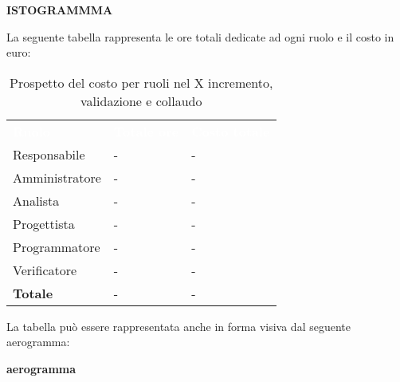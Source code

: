 \textbf{ISTOGRAMMMA}


La seguente tabella rappresenta le ore totali dedicate ad ogni ruolo e il costo in euro:

\begin{table}[!htbp]
\begin{center}
\renewcommand{\arraystretch}{1.5}
\begin{tabular}{ m{}<{\centering}  m{}<{\centering} m{}<{\centering}}
	\rowcolor{darkblue}
	\textcolor{white}{\textbf{Ruolo}}&\textcolor{white}{\textbf{Totale ore}}&\textcolor{white}{\textbf{Costo totale}}\\ 

	Responsabile  & - & - \\	

	\rowcolor{gray!10} Amministratore & - & - \\
	
	Analista & - & - \\
	
	\rowcolor{gray!10} Progettista & - & - \\
	
	Programmatore & - & - \\
	
	\rowcolor{gray!10} Verificatore & - & - \\
	
	\textbf{Totale} & - & - \\
	
\end{tabular}
\caption{Prospetto del costo per ruoli nel X incremento,  validazione e collaudo}
\end{center}
\end{table}

La tabella può essere rappresentata anche in forma visiva dal seguente aerogramma:

\textbf{aerogramma}

